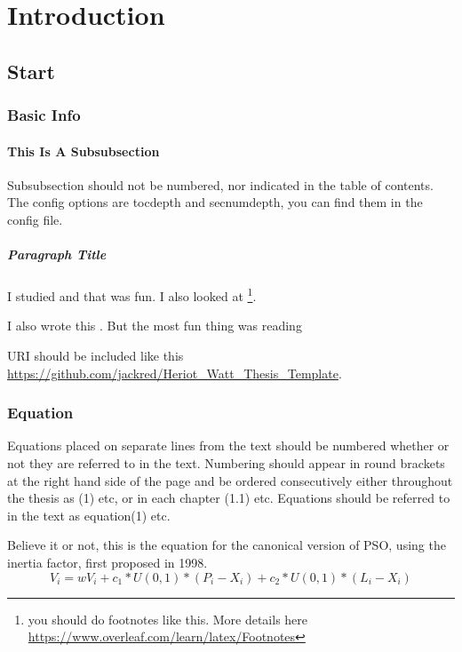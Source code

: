 \documentclass[../Thesis]{subfiles}
\begin{document}
\chapter{Introduction}

{
\hypersetup{linkcolor=black}
\minitoc
}

\section{Start}
\subsection{Basic Info}
\subsubsection{This Is A Subsubsection}
Subsubsection should not be numbered, nor indicated in the table of contents. The config options are tocdepth and secnumdepth, you can find them in the config file. 

\paragraph{Paragraph Title}
I studied \cite{C08} and that was fun. I also looked at \cite{C02} \footnote{you should do footnotes like this. More details here \url{https://www.overleaf.com/learn/latex/Footnotes}}.

I also wrote this \cite{C05}. But the most fun thing was reading \cite{C01}

URI should be included like this \url{https://github.com/jackred/Heriot_Watt_Thesis_Template}.

\subsection{Equation}
Equations placed on separate lines from the text should be numbered whether or not they are referred to in the text. Numbering should appear in round brackets at the right hand side of the page and be ordered consecutively either throughout the thesis as (1) etc, or in each chapter (1.1) etc. Equations should be referred to in the text as equation(1) etc.\par
\bigskip
Believe it or not, this is the equation for the canonical version of PSO, using the inertia factor, first proposed in 1998.
\begin{equation} 
    V_{i} = wV_{i} + c_{1} * U(0,1) * (P_{i} - X_{i}) + c_{2} * U(0,1) * (L_{i} - X_{i}) 
    \label{eqn:velocityInertia} 
\end{equation} 
\end{document}
